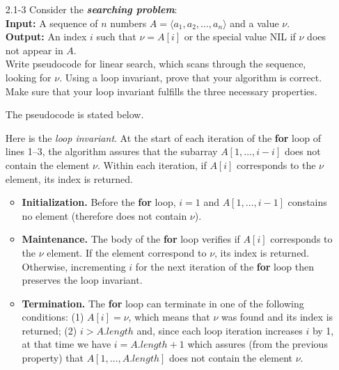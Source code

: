 \documentclass{report}
\makeatletter
\renewenvironment{framed}{%
 \def\FrameCommand##1{\hskip\@totalleftmargin
 \fboxsep=\FrameSep\fbox{##1}}%
 \MakeFramed {\advance\hsize-\width
   \@totalleftmargin\z@ \linewidth\hsize
   \@setminipage}}%
 {\par\unskip\endMakeFramed}
\makeatother
\begin{document}
\begin{enumerate}
\item[2.1{-}3]{Consider the \textbf{\emph{searching problem}}:\vspace{1mm}\\
\textbf{Input:} A sequence of $n$ numbers $A = \langle a_1, a_2, \dots, a_n \rangle$ and a value $\nu$.\\
\textbf{Output:} An index $i$ such that $\nu = A[i]$ or the special value NIL if $\nu$ does not appear in $A$.\vspace{1mm}\\
Write pseudocode for linear search, which scans through the sequence, looking
for $\nu$. Using a loop invariant, prove that your algorithm is correct. Make
sure that your loop invariant fulfills the three necessary properties.}

\begin{framed}
The pseudocode is stated below.\\
\begin{algorithm}[H]
\SetAlgoNoEnd\DontPrintSemicolon
\BlankLine
{}
\end{algorithm}

Here is the \emph{loop invariant}. At the start of each iteration of the
\textbf{for} loop of lines 1{--}3, the algorithm assures that the subarray $A[1,
\dots, i - i]$ does not contain the element $\nu$. Within each iteration, if
$A[i]$ corresponds to the $\nu$ element, its index is returned.

\begin{itemize}
  \item \textbf{Initialization.} Before the \textbf{for} loop, $i = 1$ and $A[1,
    \dots, i - 1]$ constains no element (therefore does not contain $\nu$).

  \item \textbf{Maintenance.} The body of the \textbf{for} loop verifies if
    $A[i]$ corresponds to the $\nu$ element. If the element correspond to $\nu$,
    its index is returned. Otherwise, incrementing $i$ for the next iteration of
    the \textbf{for} loop then preserves the loop invariant.

  \item \textbf{Termination.} The \textbf{for} loop can terminate in one of the
    following conditions: (1) $A[i] = \nu$, which means that $\nu$ was found and
    its index is returned; (2) $i > A.length$ and, since each loop iteration
    increases $i$ by 1, at that time we have $i = A.length + 1$ which assures
    (from the previous property) that $A[1, \dots, A.length]$ does not contain
    the element $\nu$.
\end{itemize}
\end{framed}


\end{enumerate}
\end{document}
